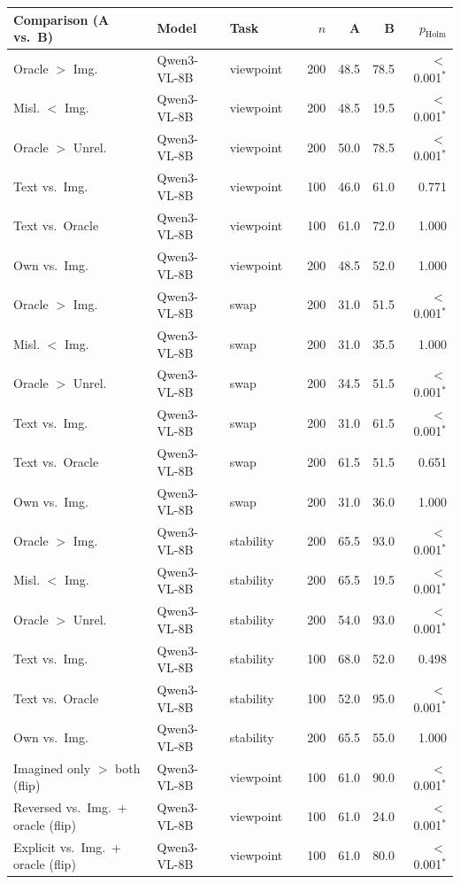 \begin{longtable}{llllrrrr}
\toprule
Comparison (A vs.\ B) & Model & Task & & $n$ & A & B & $p_{\mathrm{Holm}}$ \\
\midrule
\endhead
Oracle $>$ Img. & Qwen3-VL-8B & viewpoint & & 200 & 48.5 & 78.5 & $<$0.001$^*$ \\
Misl. $<$ Img. & Qwen3-VL-8B & viewpoint & & 200 & 48.5 & 19.5 & $<$0.001$^*$ \\
Oracle $>$ Unrel. & Qwen3-VL-8B & viewpoint & & 200 & 50.0 & 78.5 & $<$0.001$^*$ \\
Text vs.\ Img. & Qwen3-VL-8B & viewpoint & & 100 & 46.0 & 61.0 & 0.771 \\
Text vs.\ Oracle & Qwen3-VL-8B & viewpoint & & 100 & 61.0 & 72.0 & 1.000 \\
Own vs.\ Img. & Qwen3-VL-8B & viewpoint & & 200 & 48.5 & 52.0 & 1.000 \\
Oracle $>$ Img. & Qwen3-VL-8B & swap & & 200 & 31.0 & 51.5 & $<$0.001$^*$ \\
Misl. $<$ Img. & Qwen3-VL-8B & swap & & 200 & 31.0 & 35.5 & 1.000 \\
Oracle $>$ Unrel. & Qwen3-VL-8B & swap & & 200 & 34.5 & 51.5 & $<$0.001$^*$ \\
Text vs.\ Img. & Qwen3-VL-8B & swap & & 200 & 31.0 & 61.5 & $<$0.001$^*$ \\
Text vs.\ Oracle & Qwen3-VL-8B & swap & & 200 & 61.5 & 51.5 & 0.651 \\
Own vs.\ Img. & Qwen3-VL-8B & swap & & 200 & 31.0 & 36.0 & 1.000 \\
Oracle $>$ Img. & Qwen3-VL-8B & stability & & 200 & 65.5 & 93.0 & $<$0.001$^*$ \\
Misl. $<$ Img. & Qwen3-VL-8B & stability & & 200 & 65.5 & 19.5 & $<$0.001$^*$ \\
Oracle $>$ Unrel. & Qwen3-VL-8B & stability & & 200 & 54.0 & 93.0 & $<$0.001$^*$ \\
Text vs.\ Img. & Qwen3-VL-8B & stability & & 100 & 68.0 & 52.0 & 0.498 \\
Text vs.\ Oracle & Qwen3-VL-8B & stability & & 100 & 52.0 & 95.0 & $<$0.001$^*$ \\
Own vs.\ Img. & Qwen3-VL-8B & stability & & 200 & 65.5 & 55.0 & 1.000 \\
Imagined only $>$ both (flip) & Qwen3-VL-8B & viewpoint & & 100 & 61.0 & 90.0 & $<$0.001$^*$ \\
Reversed vs.\ Img.\ + oracle (flip) & Qwen3-VL-8B & viewpoint & & 100 & 61.0 & 24.0 & $<$0.001$^*$ \\
Explicit vs.\ Img.\ + oracle (flip) & Qwen3-VL-8B & viewpoint & & 100 & 61.0 & 80.0 & $<$0.001$^*$ \\

\end{longtable}
